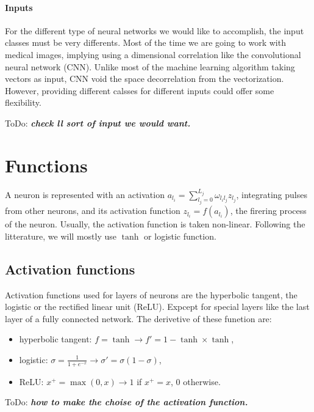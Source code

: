\documentclass[final, paper=letter,5p,times,twocolumn]{elsarticle}
\newcommand{\ToDo}[1]{ToDo: \textbf{\textit{#1}}}
\begin{document}
\paragraph{Inputs}{For the different type of neural networks we would like to accomplish, the input classes must be very differents. Most of the time we are going to work with medical images, implying using a dimensional correlation like the convolutional neural network (CNN). Unlike most of the machine learning algorithm taking vectors as input, CNN void the space decorrelation from the vectorization. However, providing different calsses for different inputs could offer some flexibility.}

\ToDo{check ll sort of input we would want.} \\

\section{Functions}

A neuron is represented with an activation $a_{l_{i}} = \sum_{l_{j} = 0}^{L_{j}} \omega_{l_{i}l_{j}} z_{l_{j}}$, integrating pulses from other neurons, and its activation function $z_{l_{i}} = f(a_{l_{i}})$, the firering process of the neuron. Usually, the activation function is taken non-linear. Following the litterature, we will mostly use $\tanh$ or logistic function.

\subsection{Activation functions}

Activation functions used for layers of neurons are the hyperbolic tangent, the logistic or the rectified linear unit (ReLU). Expcept for special layers like the last layer of a fully connected network. The derivetive of these funetion are:

\begin{itemize}
\item hyperbolic tangent: $f = \tanh \rightarrow f' = 1 - \tanh \times \tanh$,
\item logistic: $\sigma = \frac{1}{1+e^{-x}} \rightarrow \sigma' = \sigma (1 - \sigma)$,
\item ReLU: $x^{+} = \max(0,x) \rightarrow 1$ if $x^{+} = x$, 0 otherwise.
\end{itemize}
\ToDo{how to make the choise of the activation function.}
\end{document}
